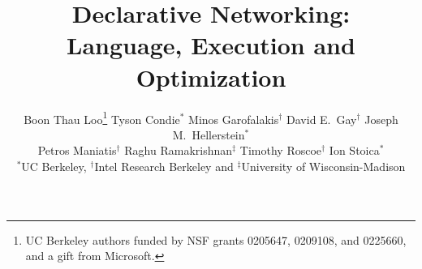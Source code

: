 \documentclass{sig-alternate}
\def\dblspace{\xspace\xspace}
\begin{document}



\newcommand{\dataloglabel}[1]{\mbox{\bf #1:}\hfil}
\newenvironment{datalog}
  {\begin{list}{}%
      {\it \small \renewcommand{\makelabel}{\dataloglabel}%
    \setlength{\parsep}{-2pt}%
    }%
  }%
{\end{list}}

\newcommand{\datalogspace}{\textcolor[gray]{1}{.}\hspace{0.8in}}


\renewcommand{\ttdefault}{cmtt}
\newenvironment{myenumerate}{\begin{list}{\arabic{foo1}.}{
      \usecounter{foo1}
      \setlength{\itemsep}{0mm}
      \setlength{\topsep}{0mm}
      \setlength{\itemsep}{-2pt}
}}{ \end{list}}

\newenvironment{mylist}{\begin{list}{$\bullet$}
    {
      \setlength{\itemsep}{0mm}
      \setlength{\topsep}{0mm}}
    }
{\end{list}}


\newcommand{\calS}{\mathcal{S}}
\newcommand{\calD}{\mathcal{D}}
\newcommand{\eat}[1]{}



\title{Declarative Networking:\\Language, Execution and Optimization}

\author{Boon Thau Loo\thanks{\scriptsize UC Berkeley authors funded
  by NSF grants 0205647, 0209108, and 0225660, and a
  gift from Microsoft.} \dblspace Tyson Condie$^*$ \dblspace Minos Garofalakis$^\dagger$\dblspace David E.\ Gay$^\dagger$\dblspace Joseph
  M.\ Hellerstein$^*$\dblspace\\Petros Maniatis$^\dagger$\dblspace Raghu Ramakrishnan$^\ddagger$\dblspace Timothy
  Roscoe$^\dagger$\dblspace Ion Stoica$^*$\\ {\small $^*$UC Berkeley, $^\dagger$Intel Research Berkeley and
  $^\ddagger$University of Wisconsin-Madison}}

\date{}
\end{document}
